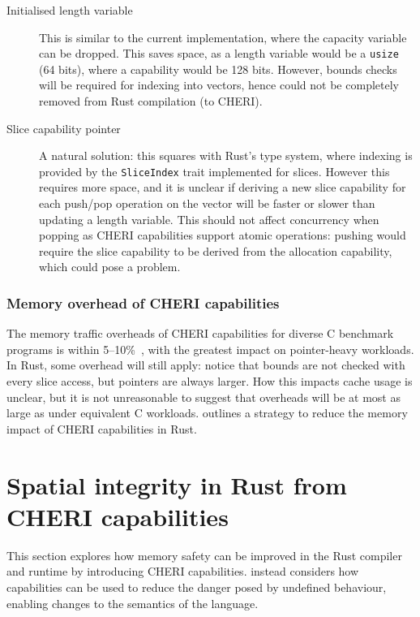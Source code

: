 \documentclass[dissertation.tex]{subfiles}
\begin{document}
\begin{description}
    \item[Initialised length variable] This is similar to the current
    implementation, where the capacity variable can be dropped.
    This saves space, as a length variable would be a \texttt{usize} (64
    bits), where a capability would be 128 bits.
    However, bounds checks will be required for indexing into vectors,
    hence could not be completely removed from Rust compilation (to
    CHERI).
    \item[Slice capability pointer] A natural solution: this squares
    with Rust's type system, where indexing is provided by the
    \texttt{SliceIndex} trait implemented for slices.
    However this requires more space, and it is unclear if deriving a
    new slice capability for each push/pop operation on the vector will
    be faster or slower than updating a length variable.
    This should not affect concurrency when popping as CHERI
    capabilities support atomic operations: pushing would require the
    slice capability to be derived from the allocation capability, which
    could pose a problem.
\end{description}

\subsubsection{Memory overhead of CHERI capabilities}
The memory traffic overheads of CHERI capabilities for diverse C
benchmark programs is within 5--10\%~\cite{cheri-tagged-memory}, with
the greatest impact on pointer-heavy workloads.
In Rust, some overhead will still apply: notice that bounds are not
checked with every slice access, but pointers are always larger.
How this impacts cache usage is unclear, but it is not unreasonable to
suggest that overheads will be at most as large as under equivalent C
workloads.
 outlines a strategy to reduce the memory
impact of CHERI capabilities in Rust.


\section{Spatial integrity in Rust from CHERI capabilities}
\label{sec:eval-rust}

This section explores how memory safety can be improved in the Rust
compiler and runtime by introducing CHERI capabilities.
 instead considers how capabilities can be
used to reduce the danger posed by undefined behaviour, enabling changes
to the semantics of the language.
\end{document}
